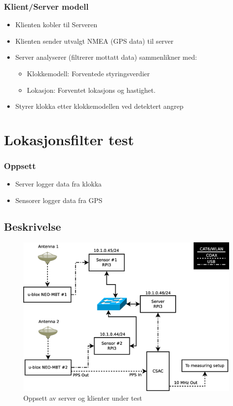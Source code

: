 \documentclass[xcolor=table]{beamer}
\begin{document}
\begin{frame}
\frametitle{Klient/Server modell}
  \begin{itemize}
    \item Klienten kobler til Serveren
    \item Klienten sender utvalgt NMEA (GPS data) til server
    \item Server analyserer (filtrerer mottatt data) sammenlikner med:
    \begin{itemize}
      \item Klokkemodell: Forventede styringsverdier
      \item Lokasjon: Forventet lokasjons og hastighet.   
    \end{itemize}
    \item Styrer klokka etter klokkemodellen ved detektert angrep
  \end{itemize}
\end{frame}

\section{Lokasjonsfilter test}
\begin{frame}
\frametitle{Oppsett}
  \begin{itemize}
    \item Server logger data fra klokka
    \item Sensorer logger data fra GPS
  \end{itemize}
  \subsection{Beskrivelse}
      \begin{figure}
        \includegraphics[scale=0.25]{thesis/graphics/server_layout.eps}
        \caption{Oppsett av server og klienter under test}
      \end{figure}
\end{frame}
\end{document}
